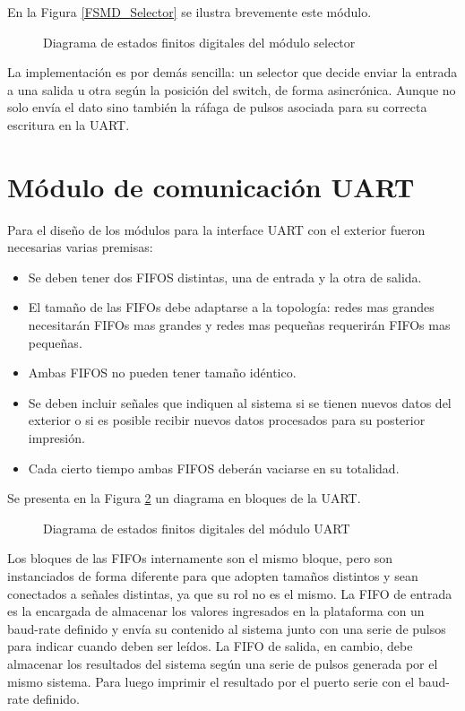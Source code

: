 		En la Figura \ref{FSMD_Selector} se ilustra brevemente este módulo.
		
		\begin{figure}[h]
		\centering
			\caption{Diagrama de estados finitos digitales del módulo selector}
			\label{fig:FSMD_Selector}
		\end{figure}	
		
		La implementación es por demás sencilla: un selector que decide enviar la entrada a una salida u otra según la posición del switch, de forma asincrónica. Aunque no solo envía el dato sino también la ráfaga de pulsos asociada para su correcta escritura en la UART.
		
\section{Módulo de comunicación UART}

	Para el diseño de los módulos para la interface UART con el exterior fueron necesarias varias premisas:
	
	\begin{itemize}
		\item Se deben tener dos FIFOS distintas, una de entrada y la otra de salida.
		\item El tamaño de las FIFOs debe adaptarse a la topología: redes mas grandes necesitarán FIFOs mas grandes y redes mas pequeñas requerirán FIFOs mas pequeñas.
		\item Ambas FIFOS no pueden tener tamaño idéntico.
		\item Se deben incluir señales que indiquen al sistema si se tienen nuevos datos del exterior o si es posible recibir nuevos datos procesados para su posterior impresión.
		\item Cada cierto tiempo ambas FIFOS deberán vaciarse en su totalidad.		
	\end{itemize}
	
		Se presenta en la Figura \ref{fig:FSMD_UART} un diagrama en bloques de la UART.
			
		\begin{figure}[h]
		\centering
			\caption{Diagrama de estados finitos digitales del módulo UART}
			\label{fig:FSMD_UART}
		\end{figure}

		Los bloques de las FIFOs internamente son el mismo bloque, pero son instanciados de forma diferente para que adopten tamaños distintos y sean conectados a señales distintas, ya que su rol no es el mismo. La FIFO de entrada es la encargada de almacenar los valores ingresados en la plataforma con un baud-rate definido y envía su contenido al sistema junto con una serie de pulsos para indicar cuando deben ser leídos. La FIFO de salida, en cambio, debe almacenar los resultados del sistema según una serie de pulsos generada por el mismo sistema. Para luego imprimir el resultado por el puerto serie con el baud-rate definido.

